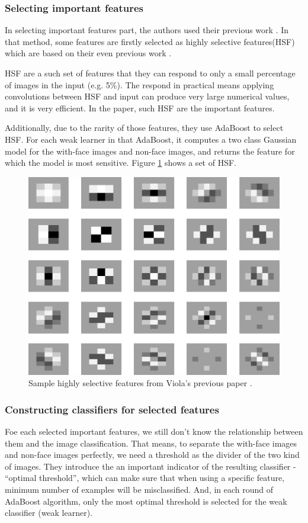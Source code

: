 \documentclass[10pt,twocolumn,letterpaper]{article}
\begin{document}
\subsubsection{Selecting important features}
In selecting important features part, the authors used their previous work \cite{imgret}.
In that method, some features are firstly selected as highly selective features(HSF) which are based on their even previous work \cite{imgdb}.

HSF are a such set of features that they can respond to only a small percentage of images in the input (e.g. 5\%).
The respond in practical means applying convolutions between HSF and input can produce very large numerical values, and it is very efficient.
In the paper, such HSF are the important features.

Additionally, due to the rarity of those features, they use AdaBoost to select HSF.
For each weak learner in that AdaBoost, it computes a two class Gaussian model for the with-face images and non-face images,
and returns the feature for which the model is most sensitive. Figure \ref{fig:hsf} shows a set of HSF.

\begin{figure}[t]
    \begin{center}
        \includegraphics[width=0.9\linewidth]{highly-selective-features}
    \end{center}
    \caption{Sample highly selective features from Viola's previous paper \cite{imgret}.}
    \label{fig:hsf}
\end{figure}

\subsubsection{Constructing classifiers for selected features}
Foe each selected important features, we still don't know the relationship between them and the image classification.
That means, to separate the with-face images and non-face images perfectly, we need a threshold as the divider of the two kind of images.
They introduce the an important indicator of the resulting classifier - ``optimal threshold'', which can make sure that
when using a specific feature, minimum number of examples will be misclassified.
And, in each round of AdaBoost algorithm, only the most optimal threshold is selected for the weak classifier (weak learner).
\end{document}
